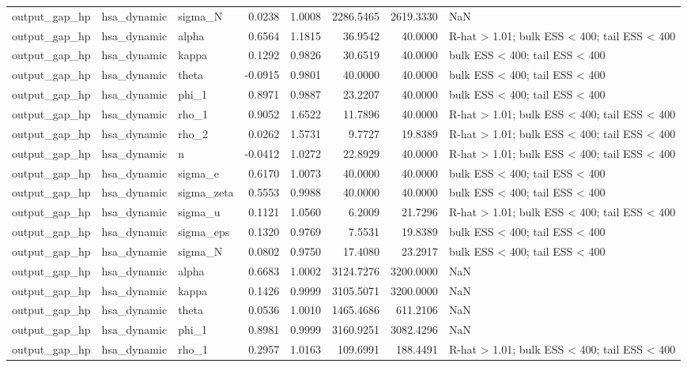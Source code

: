\begin{tabular}{lllrrrrl}
output\_gap\_hp & hsa\_dynamic & sigma\_N & 0.0238 & 1.0008 & 2286.5465 & 2619.3330 & NaN \\
output\_gap\_hp & hsa\_dynamic & alpha & 0.6564 & 1.1815 & 36.9542 & 40.0000 & R-hat > 1.01; bulk ESS < 400; tail ESS < 400 \\
output\_gap\_hp & hsa\_dynamic & kappa & 0.1292 & 0.9826 & 30.6519 & 40.0000 & bulk ESS < 400; tail ESS < 400 \\
output\_gap\_hp & hsa\_dynamic & theta & -0.0915 & 0.9801 & 40.0000 & 40.0000 & bulk ESS < 400; tail ESS < 400 \\
output\_gap\_hp & hsa\_dynamic & phi\_1 & 0.8971 & 0.9887 & 23.2207 & 40.0000 & bulk ESS < 400; tail ESS < 400 \\
output\_gap\_hp & hsa\_dynamic & rho\_1 & 0.9052 & 1.6522 & 11.7896 & 40.0000 & R-hat > 1.01; bulk ESS < 400; tail ESS < 400 \\
output\_gap\_hp & hsa\_dynamic & rho\_2 & 0.0262 & 1.5731 & 9.7727 & 19.8389 & R-hat > 1.01; bulk ESS < 400; tail ESS < 400 \\
output\_gap\_hp & hsa\_dynamic & n & -0.0412 & 1.0272 & 22.8929 & 40.0000 & R-hat > 1.01; bulk ESS < 400; tail ESS < 400 \\
output\_gap\_hp & hsa\_dynamic & sigma\_e & 0.6170 & 1.0073 & 40.0000 & 40.0000 & bulk ESS < 400; tail ESS < 400 \\
output\_gap\_hp & hsa\_dynamic & sigma\_zeta & 0.5553 & 0.9988 & 40.0000 & 40.0000 & bulk ESS < 400; tail ESS < 400 \\
output\_gap\_hp & hsa\_dynamic & sigma\_u & 0.1121 & 1.0560 & 6.2009 & 21.7296 & R-hat > 1.01; bulk ESS < 400; tail ESS < 400 \\
output\_gap\_hp & hsa\_dynamic & sigma\_eps & 0.1320 & 0.9769 & 7.5531 & 19.8389 & bulk ESS < 400; tail ESS < 400 \\
output\_gap\_hp & hsa\_dynamic & sigma\_N & 0.0802 & 0.9750 & 17.4080 & 23.2917 & bulk ESS < 400; tail ESS < 400 \\
output\_gap\_hp & hsa\_dynamic & alpha & 0.6683 & 1.0002 & 3124.7276 & 3200.0000 & NaN \\
output\_gap\_hp & hsa\_dynamic & kappa & 0.1426 & 0.9999 & 3105.5071 & 3200.0000 & NaN \\
output\_gap\_hp & hsa\_dynamic & theta & 0.0536 & 1.0010 & 1465.4686 & 611.2106 & NaN \\
output\_gap\_hp & hsa\_dynamic & phi\_1 & 0.8981 & 0.9999 & 3160.9251 & 3082.4296 & NaN \\
output\_gap\_hp & hsa\_dynamic & rho\_1 & 0.2957 & 1.0163 & 109.6991 & 188.4491 & R-hat > 1.01; bulk ESS < 400; tail ESS < 400 \\

\end{tabular}
